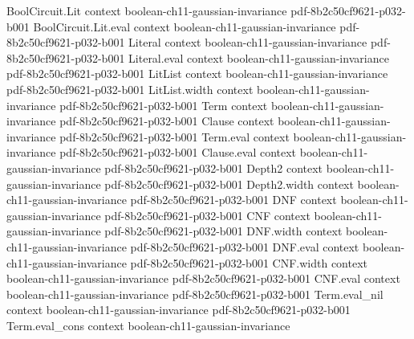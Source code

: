 \begin{theorem}
\label{BooleanAnalysis.GaussianSpace.hermite_expansion}
\leanok
{}
\proofstep
  {BoolCircuit.Lit}
  {context}
  {boolean-ch11-gaussian-invariance}
  {pdf-8b2c50cf9621-p032-b001}
\proofstep
  {BoolCircuit.Lit.eval}
  {context}
  {boolean-ch11-gaussian-invariance}
  {pdf-8b2c50cf9621-p032-b001}
\proofstep
  {Literal}
  {context}
  {boolean-ch11-gaussian-invariance}
  {pdf-8b2c50cf9621-p032-b001}
\proofstep
  {Literal.eval}
  {context}
  {boolean-ch11-gaussian-invariance}
  {pdf-8b2c50cf9621-p032-b001}
\proofstep
  {LitList}
  {context}
  {boolean-ch11-gaussian-invariance}
  {pdf-8b2c50cf9621-p032-b001}
\proofstep
  {LitList.width}
  {context}
  {boolean-ch11-gaussian-invariance}
  {pdf-8b2c50cf9621-p032-b001}
\proofstep
  {Term}
  {context}
  {boolean-ch11-gaussian-invariance}
  {pdf-8b2c50cf9621-p032-b001}
\proofstep
  {Clause}
  {context}
  {boolean-ch11-gaussian-invariance}
  {pdf-8b2c50cf9621-p032-b001}
\proofstep
  {Term.eval}
  {context}
  {boolean-ch11-gaussian-invariance}
  {pdf-8b2c50cf9621-p032-b001}
\proofstep
  {Clause.eval}
  {context}
  {boolean-ch11-gaussian-invariance}
  {pdf-8b2c50cf9621-p032-b001}
\proofstep
  {Depth2}
  {context}
  {boolean-ch11-gaussian-invariance}
  {pdf-8b2c50cf9621-p032-b001}
\proofstep
  {Depth2.width}
  {context}
  {boolean-ch11-gaussian-invariance}
  {pdf-8b2c50cf9621-p032-b001}
\proofstep
  {DNF}
  {context}
  {boolean-ch11-gaussian-invariance}
  {pdf-8b2c50cf9621-p032-b001}
\proofstep
  {CNF}
  {context}
  {boolean-ch11-gaussian-invariance}
  {pdf-8b2c50cf9621-p032-b001}
\proofstep
  {DNF.width}
  {context}
  {boolean-ch11-gaussian-invariance}
  {pdf-8b2c50cf9621-p032-b001}
\proofstep
  {DNF.eval}
  {context}
  {boolean-ch11-gaussian-invariance}
  {pdf-8b2c50cf9621-p032-b001}
\proofstep
  {CNF.width}
  {context}
  {boolean-ch11-gaussian-invariance}
  {pdf-8b2c50cf9621-p032-b001}
\proofstep
  {CNF.eval}
  {context}
  {boolean-ch11-gaussian-invariance}
  {pdf-8b2c50cf9621-p032-b001}
\proofstep
  {Term.eval_nil}
  {context}
  {boolean-ch11-gaussian-invariance}
  {pdf-8b2c50cf9621-p032-b001}
\proofstep
  {Term.eval_cons}
  {context}
  {boolean-ch11-gaussian-invariance}

\end{theorem}
